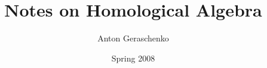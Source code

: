 

{

\title{\vspace*{-3cm} Notes on Homological Algebra\vspace*{-5mm}}
\author{Anton Geraschenko\vspace*{-5mm}}
\date{Spring 2008\vspace*{-5mm}}
\maketitle
{}    %

{\thispagestyle{empty}
 \vspace*{-2em}
 \tableofcontents
}


}{
}{
}{
}{
}{
}{
}{
}{
}{
}{
}{
}{
}{
}{
}{
}{
}{
}{
}{
}{
}{
}{
}{
}{
}{
}{
}{
}{
}{
}{



}
